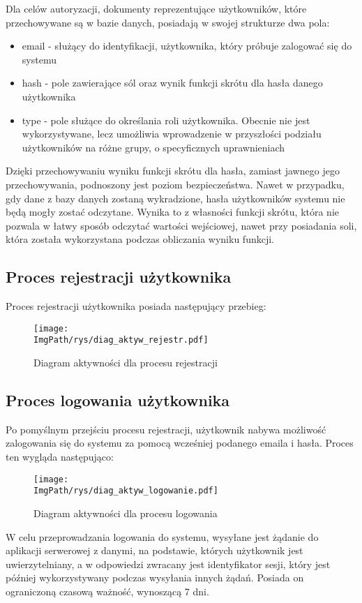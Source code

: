\documentclass[a4paper,12pt,twoside,openany]{report}
\newcommand{\ImgPath}{.}
\begin{document}
Dla celów autoryzacji, dokumenty reprezentujące użytkowników, które przechowywane są w bazie danych, posiadają w swojej strukturze dwa pola:
\begin{itemize}
	\item email - służący do identyfikacji, użytkownika, który próbuje zalogować się do systemu
	
	\item hash - pole zawierające sól oraz wynik funkcji skrótu dla hasła danego użytkownika
	
	\item type - pole służące do określania roli użytkownika. Obecnie nie jest wykorzystywane, lecz umożliwia wprowadzenie w przyszłości podziału użytkowników na różne grupy, o specyficznych uprawnieniach
	
\end{itemize}
Dzięki przechowywaniu wyniku funkcji skrótu dla hasła, zamiast jawnego jego przechowywania, podnoszony jest poziom bezpieczeństwa. Nawet w przypadku, gdy dane z bazy danych zostaną wykradzione, hasła użytkowników systemu nie będą mogły zostać odczytane. Wynika to z własności funkcji skrótu, która nie pozwala w łatwy sposób odczytać wartości wejściowej, nawet przy posiadania soli, która została wykorzystana podczas obliczania wyniku funkcji.


\subsection{Proces rejestracji użytkownika}

Proces rejestracji użytkownika posiada następujący przebieg:
 \begin{figure}[!htbp]
	\begin{center}
		\centering
		\texttt{[image: \\ImgPath/rys/diag\_aktyw\_rejestr.pdf]}
	\end{center}
	\caption{Diagram aktywności dla procesu rejestracji}
	\label{diagramAktywnosciRejstracja}
\end{figure}
\newpage

\subsection{Proces logowania użytkownika}
Po pomyślnym przejściu procesu rejestracji, użytkownik nabywa możliwość zalogowania się do systemu za pomocą wcześniej podanego emaila i hasła. Proces ten wygląda następująco:


\begin{figure}[!htbp]
	\begin{center}
		\centering
		\texttt{[image: \\ImgPath/rys/diag\_aktyw\_logowanie.pdf]}
	\end{center}
	\caption{Diagram aktywności dla procesu logowania}
	\label{diagramAktywnosciLogowanie}
\end{figure}
\newpage
W celu przeprowadzania logowania do systemu, wysyłane jest żądanie do aplikacji serwerowej z danymi, na podstawie, których użytkownik jest uwierzytelniany, a w odpowiedzi zwracany jest identyfikator sesji, który jest później wykorzystywany podczas wysyłania innych żądań. Posiada on ograniczoną czasową ważność, wynoszącą 7 dni.
\end{document}
